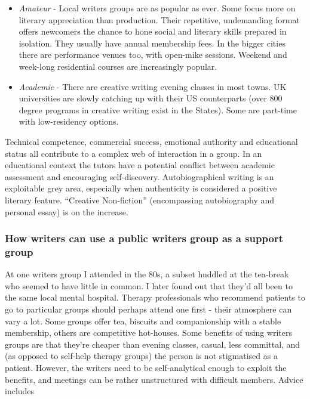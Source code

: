 \documentclass[11pt]{article}
\begin{document}
\begin{itemize}
\item \textit{Amateur} - Local writers groups are as popular as ever. Some focus more on literary appreciation than production. Their repetitive, undemanding format offers newcomers the chance to hone social and literary skills prepared in isolation. They usually have annual membership fees. In the bigger cities there are performance venues too, with open-mike sessions. Weekend and week-long residential courses are increasingly popular.
 
\item \textit{Academic} - There are creative writing evening classes in most towns.  UK universities are slowly catching up with their US counterparts (over 800 degree programs in creative writing exist in the States). Some are part-time with low-residency options.
 
\end{itemize}


 Technical competence, commercial success, emotional authority and educational status all contribute to a complex web of interaction in a group. In an educational context the tutors have a potential conflict between academic assessment and encouraging self-discovery. Autobiographical
writing is an exploitable grey area, especially when authenticity is considered a positive literary feature.  ``Creative Non-fiction'' (encompassing autobiography and personal essay) is on the increase.

\subsubsection*{How writers can use a public writers group as a support group}


 At one writers group I attended in the 80s, a subset huddled at the tea-break who seemed to have little in common. I later found out that they'd all been to the same local mental hospital. Therapy professionals who recommend patients to go to particular groups should perhaps attend one first - their atmosphere can vary a lot. Some groups offer tea, biscuits and companionship with a stable membership, others are competitive hot-houses. Some benefits of using writers groups are that they're cheaper than evening classes, casual, less committal, and (as opposed to self-help therapy groups) the person is not stigmatised as a patient. However, the writers need to be self-analytical enough to exploit the benefits, and meetings can be rather unstructured with difficult members. Advice includes
 
\end{document}
